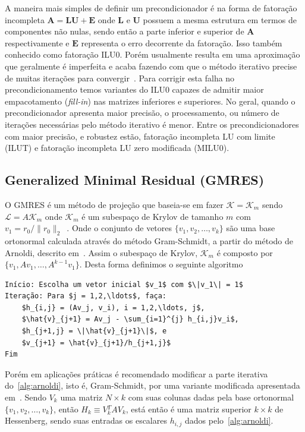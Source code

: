\documentclass[
	12pt,				  %
	openright,		%
	twoside,			%
	a4paper,			%
	chapter=TITLE,		    %
	english,			%
	brazil				%
	]{abntex2}
\begin{document}
A maneira mais simples de definir um precondicionador é na forma de fatoração
incompleta $\mathbf{A = LU + E}$ onde $\mathbf{L}$ e $\mathbf{U}$ possuem a
mesma estrutura em termos de componentes não nulas, sendo então a parte inferior e
superior de $\mathbf{A}$ respectivamente e $\mathbf{E}$ representa o erro
decorrente da fatoração. Isso também conhecido como fatoração ILU0. Porém usualmente
resulta em uma aproximação que geralmente é imperfeita e acaba fazendo com que
o método iterativo precise de muitas iterações para convergir~\cite{saad1994}.
Para corrigir esta falha no precondicionamento temos variantes do ILU0 capazes
de admitir maior empacotamento (\textit{fill-in}) nas matrizes inferiores e
superiores. No geral, quando o precondicionador apresenta maior precisão, o
processamento, ou número de iterações necessárias pelo método iterativo é
menor. Entre os precondicionadores com maior precisão, e robustez estão,
fatoração incompleta LU com limite (ILUT) e fatoração incompleta LU zero
modificada (MILU0). 

\subsection{Generalized Minimal Residual (GMRES)}\label{sec:gmres}

O GMRES é um método de projeção que baseia-se em fazer $\mathcal{K = K}_m$
sendo $\mathcal{L} = A\mathcal{K}_m$ onde $\mathcal{K}_m$ é um subespaço de
Krylov de tamanho $m$ com $v_1 = r_0 / \|r_0\|_2$~\cite{saad2003}. Onde o
conjunto de vetores $\{v_1, v_2, \ldots, v_k\}$ são uma base ortonormal calculada
através do método Gram-Schmidt, a partir do método de Arnoldi, descrito
em~\cite{arnoldi1951}. Assim o subespaço de Krylov, $\mathcal{K}_m$ é composto
por $\{v_1, Av_1, \ldots, A^{k-1}v_1\}$. Desta forma definimos o seguinte
algoritmo
\begin{lstlisting}[caption = Arnoldi, fontadjust, label= alg:arnoldi]
Início: Escolha um vetor inicial $v_1$ com $\|v_1\| = 1$
Iteração: Para $j = 1,2,\ldots$, faça:
    $h_{i,j} = (Av_j, v_i), i = 1,2,\ldots, j$,
    $\hat{v}_{j+1} = Av_j - \sum_{i=1}^{j} h_{i,j}v_i$,
    $h_{j+1,j} = \|\hat{v}_{j+1}\|$, e
    $v_{j+1} = \hat{v}_{j+1}/h_{j+1,j}$
Fim
\end{lstlisting}

Porém em aplicações práticas é recomendado modificar a parte iterativa
do~\autoref{alg:arnoldi}, isto é, Gram-Schmidt, por uma variante modificada
apresentada em~\cite{stewart1973}. Sendo $V_k$ uma matriz $N\times k$ com suas
colunas dadas pela base ortonormal $\{v_1, v_2,\ldots,v_k\}$, então $H_k \equiv
V{_k^T}AV_k$, está então é uma matriz superior $k \times k$ de Hessenberg, sendo
suas entradas os escalares $h_{i,j}$ dados pelo~\autoref{alg:arnoldi}.
\end{document}
